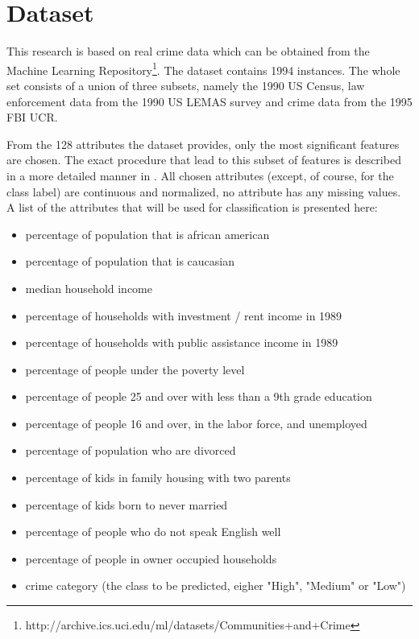 \section{Dataset}

This research is based on real crime data which can be obtained from the Machine Learning
Repository\footnote{http://archive.ics.uci.edu/ml/datasets/Communities+and+Crime}. The
dataset contains 1994 instances. The whole set consists of a union of
three subsets, namely the 1990 US Census, law enforcement data from
the 1990 US LEMAS survey and crime data from the 1995 FBI UCR.

From the 128 attributes the dataset provides, only the most
significant features are chosen.
The exact procedure that lead to this subset of features is
described in a more detailed manner in .
All chosen attributes (except, of course, for the class label)
are continuous and normalized, no attribute has any missing
values.
A list of the attributes that will be used for classification is
presented here:
\begin{itemize}
  \setlength{\itemsep}{-2pt}
  \item percentage of population that is african american
  \item percentage of population that is caucasian
  \item median household income
  \item percentage of households with investment / rent income in 1989
  \item percentage of households with public assistance income in 1989
  \item percentage of people under the poverty level
  \item percentage of people 25 and over with less than a 9th grade education
  \item percentage of people 16 and over, in the labor force, and unemployed
  \item percentage of population who are divorced
  \item percentage of kids in family housing with two parents
  \item percentage of kids born to never married
  \item percentage of people who do not speak English well
  \item percentage of people in owner occupied households
  \item crime category (the class to be predicted, eigher "High", "Medium" or "Low")
\end{itemize}

